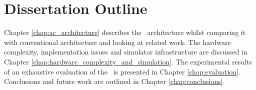 \section{Dissertation Outline}

Chapter \ref{chap:ac_architecture} describes the \AC\ architecture whilst comparing it with conventional architecture and looking at related work. The hardware complexity, implementation issues and simulator infrastructure are discussed in Chapter \ref{chap:hardware_complexity_and_simulation}. The experimental results of an exhaustive evaluation of the \AC\ is presented in Chapter \ref{chap:evaluation}. Conclusions and future work are outlined in Chapter \ref{chap:conclusions}.
